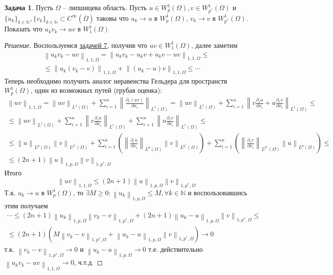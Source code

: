 \documentclass[12pt,a4paper]{article}
\theoremstyle{definition}
\newtheorem{exercise}{Задача}
\newenvironment{solution}
{\renewcommand\qedsymbol{$\blacksquare$}\begin{proof}[Решение]}
{\end{proof}}
\newcommand{\Natural}{\mathbb{N}}
\newcommand{\norm}[1]{\left\lVert#1\right\rVert}
\begin{document}
\begin{exercise}
	Пусть $\Omega$ -- липшицева область. Пусть $u \in W_p^1 (\Omega), v \in W_{p^*}^1 (\Omega)$ и $\{u_k\}_{k\in\Natural}, \{v_k\}_{k\in\Natural} \subset C^\infty (\overline{\Omega})$ таковы что $u_k \to u$ в $W_p^1 (\Omega)$, $v_k \to v$ в $W_{p^*}^1 (\Omega)$. Показать что $u_k v_k \to u v$ в $W_1^1 (\Omega)$
\end{exercise}
\begin{solution}
	Воспользуемся \hyperref[exr:1]{задачей 7}, получив что $uv \in W_1^1 (\Omega)$, далее заметим
	\begin{multline*}
		\norm{u_k v_k - u v}_{1, 1, \Omega} = \norm{u_k v_k - u_k v + u_k v - u v}_{1, 1, \Omega} \leq \\ \leq \norm{u_k (v_k - v)}_{1, 1, \Omega} + \norm{(u_k - u)v}_{1, 1, \Omega} \leq \cdots
	\end{multline*}
	Теперь необходимо получить аналог неравенства Гельдера для пространств $W_p^1 (\Omega)$, один из возможных путей (грубая оценка):
	\begin{multline*}
		\norm{uv}_{1, 1, \Omega} = \norm{uv}_{L^1 (\Omega)} + \sum\limits_{i=1}^{n}{\norm{\frac{\partial_c (uv)}{\partial x_i}}_{L^1 (\Omega)}} = \norm{uv}_{L^1 (\Omega)} + \sum\limits_{i=1}^{n}{\norm{ v \frac{\partial_c u}{\partial x_i} + u \frac{\partial_c v}{\partial x_i} }_{L^1 (\Omega)}} \leq \\ \leq \norm{uv}_{L^1 (\Omega)} + \sum\limits_{i=1}^{n}{\norm{v \frac{\partial_c u}{\partial x_i}}_{L^1 (\Omega)}} + \sum\limits_{i=1}^{n}{\norm{u \frac{\partial_c v}{\partial x_i}}_{L^1 (\Omega)}} \leq \\
		\leq \norm{u}_{L^p (\Omega)}\norm{v}_{L^{p^*} (\Omega)} + \sum\limits_{i=1}^{n}{\left( \norm{\frac{\partial_c u}{\partial x_i}}_{L^p (\Omega)} \norm{v}_{L^{p^*} (\Omega)} \right)} + \sum\limits_{i=1}^{n}{\left(\norm{\frac{\partial_c v}{\partial x_i}}_{L^{p^*} (\Omega)} \norm{u}_{L^p (\Omega)} \right)} \leq \\ \leq (2n+1) \norm{u}_{1, p, \Omega} \norm{v}_{1, p^*, \Omega}
	\end{multline*}
	Итого
	\begin{equation}
		\norm{uv}_{1, 1, \Omega} \leq (2n+1)\norm{u}_{1, p, \Omega}\norm{v}_{1, p^*, \Omega}
	\end{equation}
	Т.к. $u_k \to u$ в $W_p^1 (\Omega)$, то $\exists M \geq 0: \norm{u_k}_{1, p, \Omega} \leq M, \forall k \in \Natural$ и воспользовавшись этим получаем
	\begin{multline*}
		\cdots \leq (2n+1)\norm{u_k}_{1, p, \Omega}\norm{v_k - v}_{1, p^*, \Omega} + (2n+1)\norm{u_k - u}_{1, p, \Omega}\norm{v}_{1, p^*, \Omega} \leq \\ \leq
		(2n+1) \left( M \norm{v_k - v}_{1, p^*, \Omega} + \norm{u_k - u}_{1, p, \Omega} \norm{v}_{1, p^*, \Omega} \right) \to 0
	\end{multline*}
	т.к. $\norm{v_k - v}_{1, p^*, \Omega} \to 0$ и $\norm{u_k - u}_{1, p, \Omega} \to 0$ т.е. действительно $\norm{u_k v_k - uv}_{1, 1, \Omega} \to 0$, ч.т.д.
\end{solution}
\newpage
	
\end{document}
